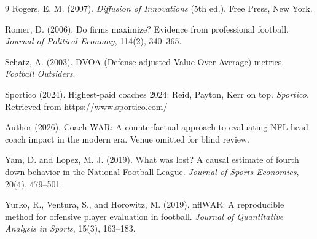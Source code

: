 \documentclass[USenglish]{article}
\theoremstyle{dgthm}
\theoremstyle{dgdef}
\begin{document}
\begin{thebibliography}{9}
Rogers, E. M. (2007). \emph{Diffusion of Innovations} (5th ed.). Free Press, New York.

Romer, D. (2006). Do firms maximize? Evidence from professional football. \emph{Journal of Political Economy}, 114(2), 340–365.

Schatz, A. (2003). DVOA (Defense-adjusted Value Over Average) metrics. \emph{Football Outsiders}.

Sportico (2024). Highest-paid coaches 2024: Reid, Payton, Kerr on top. \emph{Sportico}. Retrieved from https://www.sportico.com/

Author (2026). Coach WAR: A counterfactual approach to evaluating NFL head coach impact in the modern era. Venue omitted for blind review.

Yam, D. and Lopez, M. J. (2019). What was lost? A causal estimate of fourth down behavior in the National Football League. \emph{Journal of Sports Economics}, 20(4), 479–501.

Yurko, R., Ventura, S., and Horowitz, M. (2019). nflWAR: A reproducible method for offensive player evaluation in football. \emph{Journal of Quantitative Analysis in Sports}, 15(3), 163--183.

\end{thebibliography}
\end{document}

